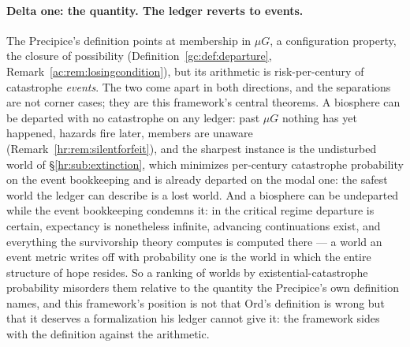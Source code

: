 \documentclass[11pt]{article}
\numberwithin{equation}{section}
\theoremstyle{plain}
\theoremstyle{definition}
\theoremstyle{remark}
\begin{document}
\paragraph{Delta one: the quantity. The ledger reverts to events.}
The Precipice's definition points at membership in $\mu G$, a
configuration property, the closure of possibility
(Definition~\ref{gc:def:departure},
Remark~\ref{ac:rem:losingcondition}), but its arithmetic is
risk-per-century of catastrophe \emph{events}. The two come apart in
both directions, and the separations are not corner cases; they are
this framework's central theorems. A biosphere can be departed with no
catastrophe on any ledger: past $\mu G$ nothing has yet happened, hazards fire later, members are unaware
(Remark~\ref{hr:rem:silentforfeit}), and the sharpest instance is
the undisturbed world of \S\ref{hr:sub:extinction}, which minimizes
per-century catastrophe probability on the event bookkeeping and is
already departed on the modal one: the safest world the ledger can
describe is a lost world. And a biosphere can be undeparted while the
event bookkeeping condemns it: in the critical regime departure is
certain, expectancy is nonetheless infinite, advancing continuations
exist, and everything the survivorship theory computes is computed
there --- a world an event metric writes off with probability one is
the world in which the entire structure of hope resides. So a ranking
of worlds by existential-catastrophe probability misorders them
relative to the quantity the Precipice's own definition names, and
this framework's position is not that Ord's definition is wrong but
that it deserves a formalization his ledger cannot give it: the
framework sides with the definition against the arithmetic.
\end{document}
